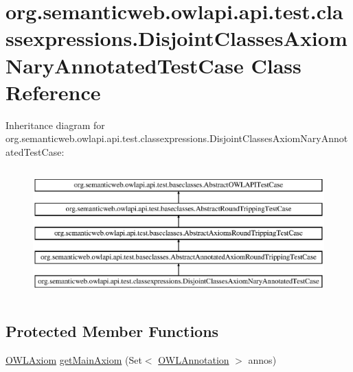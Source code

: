 \hypertarget{classorg_1_1semanticweb_1_1owlapi_1_1api_1_1test_1_1classexpressions_1_1_disjoint_classes_axiom_nary_annotated_test_case}{\section{org.\-semanticweb.\-owlapi.\-api.\-test.\-classexpressions.\-Disjoint\-Classes\-Axiom\-Nary\-Annotated\-Test\-Case Class Reference}
\label{classorg_1_1semanticweb_1_1owlapi_1_1api_1_1test_1_1classexpressions_1_1_disjoint_classes_axiom_nary_annotated_test_case}
}
Inheritance diagram for org.\-semanticweb.\-owlapi.\-api.\-test.\-classexpressions.\-Disjoint\-Classes\-Axiom\-Nary\-Annotated\-Test\-Case\-:\begin{figure}[H]
\begin{center}
\leavevmode
\includegraphics[height=5.000000cm]{classorg_1_1semanticweb_1_1owlapi_1_1api_1_1test_1_1classexpressions_1_1_disjoint_classes_axiom_nary_annotated_test_case}
\end{center}
\end{figure}
\subsection*{Protected Member Functions}
\begin{DoxyCompactItemize}
\item 
\hyperlink{interfaceorg_1_1semanticweb_1_1owlapi_1_1model_1_1_o_w_l_axiom}{O\-W\-L\-Axiom} \hyperlink{classorg_1_1semanticweb_1_1owlapi_1_1api_1_1test_1_1classexpressions_1_1_disjoint_classes_axiom_nary_annotated_test_case_a99a16f6ef0ef726c62c3bf65d4d1388e}{get\-Main\-Axiom} (Set$<$ \hyperlink{interfaceorg_1_1semanticweb_1_1owlapi_1_1model_1_1_o_w_l_annotation}{O\-W\-L\-Annotation} $>$ annos)
\end{DoxyCompactItemize}
